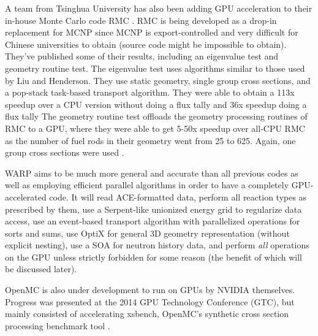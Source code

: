 A team from Tsinghua University has also been adding GPU acceleration to their in-house Monte Carlo code RMC \cite{qixu}. RMC is being developed as a drop-in replacement for MCNP since MCNP is export-controlled and very difficult for Chinese universities to obtain (source code might be impossible to obtain).  They've published some of their results, including an eigenvalue test and geometry routine test.  The eigenvalue test uses algorithms similar to those used by Liu and Henderson.  They use static geometry, single group cross sections, and a pop-stack task-based transport algorithm.  They were able to obtain a 113x speedup over a CPU version without doing a flux tally and 36x speedup doing a flux tally \cite{qixu_ans_winter}   The geometry routine test offloads the geometry processing routines of RMC to a GPU, where they were able to get 5-50x speedup over all-CPU RMC as the number of fuel rods in their geometry went from 25 to 625.  Again, one group cross sections were used \cite{qixu}.

WARP aims to be much more general and accurate than all previous codes as well as employing efficient parallel algorithms in order to have a completely GPU-accelerated code.  It will read ACE-formatted data, perform all reaction types as prescribed by them, use a Serpent-like unionized energy grid to regularize data access, use an event-based transport algorithm with parallelized operations for sorts and sums, use OptiX for general 3D geometry representation (without explicit nesting), use a SOA for neutron history data, and perform \emph{all} operations on the GPU unless strictly forbidden for some reason (the benefit of which will be discussed later).
	
OpenMC is also under development to run on GPUs by NVIDIA themselves.  Progress was presented at the 2014 GPU Technology Conference (GTC), but mainly consisted of accelerating xsbench, OpenMC's synthetic cross section processing benchmark tool \cite{scudiero,openmc}.
